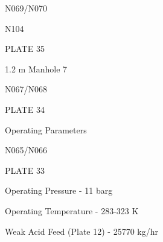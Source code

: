 \documentclass[a4paper,portrait,12pt]{article}
\begin{document}
\begin{flushleft}
N069/N070
\end{flushleft}





\begin{flushleft}
N104
\end{flushleft}





\begin{flushleft}
PLATE 35
\end{flushleft}


\begin{flushleft}
1.2 m Manhole 7
\end{flushleft}


\begin{flushleft}
N067/N068
\end{flushleft}





\begin{flushleft}
PLATE 34
\end{flushleft}





\begin{flushleft}
Operating Parameters
\end{flushleft}





\begin{flushleft}
N065/N066
\end{flushleft}





\begin{flushleft}
PLATE 33
\end{flushleft}





\begin{flushleft}
Operating Pressure - 11 barg
\end{flushleft}


\begin{flushleft}
Operating Temperature - 283-323 K
\end{flushleft}


\begin{flushleft}
Weak Acid Feed (Plate 12) - 25770 kg/hr
\end{flushleft}
\end{document}
